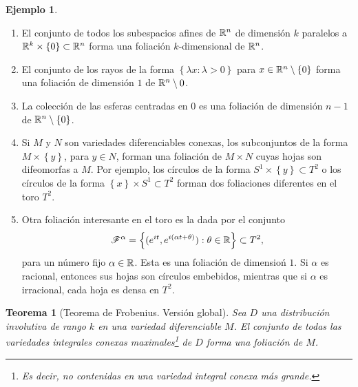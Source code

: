 \documentclass[11pt,a4paper]{amsbook}
\newtheorem{thm}[subsection]{Teorema}
\theoremstyle{remark} \newtheorem{rmk}[subsection]{Observación}
\theoremstyle{definition} \newtheorem{defn}[subsection]{Definición}
\theoremstyle{definition} \newtheorem{ex}[subsection]{Ejemplo}
\theoremstyle{definition} \newtheorem{ej}[subsection]{Ejercicio}
\begin{document}
\begin{ex} \leavevmode
\begin{enumerate}
\item  El conjunto de todos los subespacios afines de $\mathbb R^n$ de dimensión $k$ paralelos a $\mathbb R^k\times \left\{ 0 \right\} \subset \mathbb R^n$ forma una foliación $k$-dimensional de $\mathbb R^n$.
  \item El conjunto de los rayos de la forma $\left\{ \lambda x: \lambda>0 \right\}$ para $x\in \mathbb R^{n}\setminus \left\{ 0 \right\}$ forma una foliación de dimensión $1$ de $\mathbb R^n\setminus 0$.
\item La colección de las esferas centradas en $0$ es una foliación de dimensión $n-1$ de $\mathbb R^n\setminus \left\{ 0 \right\}$.
  \item Si $M$ y $N$ son variedades diferenciables conexas, los subconjuntos de la forma $M\times \left\{ y \right\}$, para $y\in N$, forman una foliación de $M\times N$ cuyas hojas son difeomorfas a $M$. Por ejemplo, los círculos de la forma $S^1\times \left\{ y \right\}\subset T^2$ o los círculos de la forma $\left\{ x \right\}\times S^1 \subset T^2$ forman dos foliaciones diferentes en el toro $T^2$.
  \item Otra foliación interesante en el toro es la dada por el conjunto
        \begin{equation*}
\mathscr F^\alpha = \left\{ (e^{it}, e^{i(\alpha t + \theta)}): \theta \in \mathbb R \right\}\subset T^2,
        \end{equation*}
para un número fijo $\alpha \in \mathbb R$. Esta es una foliación de dimensioń $1$. Si $\alpha$ es racional, entonces sus hojas son círculos embebidos, mientras que si $\alpha$ es irracional, cada hoja es densa en $T^2$.
\end{enumerate}
\end{ex}

\begin{thm}[Teorema de Frobenius. Versión global]
Sea $D$ una distribución involutiva de rango $k$ en una variedad diferenciable $M$. El conjunto de todas las variedades integrales conexas maximales\footnote{Es decir, no contenidas en una variedad integral conexa más grande.} de $D$ forma una foliación de $M$.
\end{thm}
\end{document}
